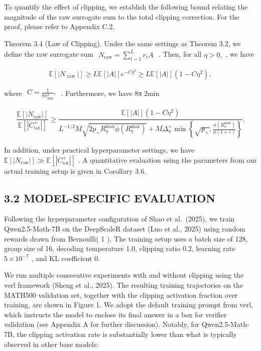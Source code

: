 \documentclass[
  10
]{article}
\begin{document}
To quantify the effect of clipping, we establish the following bound
relating the magnitude of the raw surrogate sum to the total clipping
correction. For the proof, please refer to Appendix C.2.

Theorem 3.4 (Law of Clipping). Under the same settings as Theorem 3.2,
we define the raw surrogate sum
\(\begin{array} { r } { N _ { \mathrm { r a w } } = \sum _ { t = 1 } ^ { L } r _ { t } A } \end{array}\)
. Then, for all \(\eta > 0 ,\) , we have

\[
\mathbb {E} [ | N _ {\text { raw }} | ] \geq L \mathbb {E} [ | A | ] e ^ {- C \eta^ {2}} \geq L \mathbb {E} [ | A | ] (1 - C \eta^ {2}), \tag {7}
\]

where
\(\begin{array} { r } { C = \frac { 1 } { 8 \pi _ { \mathrm { m i n } } ^ { 2 } } . } \end{array}\)
. Furthermore, we have 8π 2min

\[
\frac {\mathbb {E} [ | N _ {\mathrm{raw}} | ]}{\mathbb {E} [ | C _ {\mathrm{tot}} ^ {+} | ]} \geq \frac {\mathbb {E} [ | A | ] (1 - C \eta^ {2})}{L ^ {- 1 / 2} M \sqrt {2 p _ {+} R _ {\eta} ^ {\max} \phi (R _ {\eta} ^ {\max})} + M \Delta_ {\eta} ^ {+} \min \left\{\sqrt {p _ {+}} , \frac {\phi (R _ {\eta} ^ {\max})}{\phi (1 + \varepsilon)} \right\}}.
\]

In addition, under practical hyperparameter settings, we have
\(\mathbb { E } [ | N _ { \mathrm { r a w } } | ] \gg \mathbb { E } [ | C _ { \mathrm { t o t } } ^ { + } | ]\)
. A quantitative evaluation using the parameters from our actual
training setup is given in Corollary 3.6.

\subsection{3.2 MODEL-SPECIFIC
EVALUATION}\label{model-specific-evaluation}

Following the hyperparameter configuration of Shao et al.~(2025), we
train Qwen2.5-Math-7B on the DeepScaleR dataset (Luo et al., 2025) using
random rewards drawn from Bernoulli( 1 ). The training setup uses a
batch size of 128, group size of 16, decoding temperature 1.0, clipping
ratio 0.2, learning rate \(5 \times 1 0 ^ { - 7 }\) , and KL coefficient
0.

We run multiple consecutive experiments with and without clipping using
the verl framework (Sheng et al., 2025). The resulting training
trajectories on the MATH500 validation set, together with the clipping
activation fraction over training, are shown in Figure 1. We adopt the
default training prompt from verl, which instructs the model to enclose
its final answer in a box for verifier validation (see Appendix A for
further discussion). Notably, for Qwen2.5-Math-7B, the clipping
activation rate is substantially lower than what is typically observed
in other base models:
\end{document}
